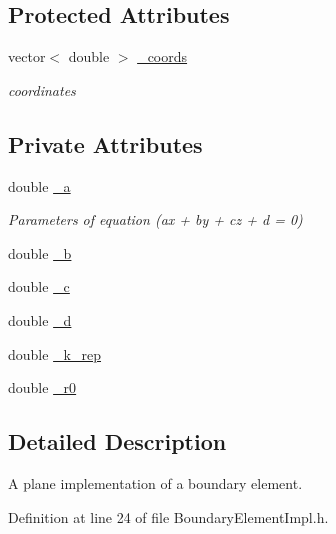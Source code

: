 \subsection*{Protected Attributes}
\begin{DoxyCompactItemize}
\item 
vector$<$ double $>$ \hyperlink{classBoundaryElement_ab51302e10e3e2def98438234ba5bf801}{\+\_\+coords}
\begin{DoxyCompactList}\small\item\em coordinates \end{DoxyCompactList}\end{DoxyCompactItemize}
\subsection*{Private Attributes}
\begin{DoxyCompactItemize}
\item 
double \hyperlink{classPlaneBoundaryElement_ad067a43fa80af86a71fa244024a3a92b}{\+\_\+a}
\begin{DoxyCompactList}\small\item\em Parameters of equation (ax + by + cz + d = 0) \end{DoxyCompactList}\item 
double \hyperlink{classPlaneBoundaryElement_a1725bf5a9d6a0d6df973bbf834f64afd}{\+\_\+b}
\item 
double \hyperlink{classPlaneBoundaryElement_ac76ace6d0b2da7e27cba5afd85ae8935}{\+\_\+c}
\item 
double \hyperlink{classPlaneBoundaryElement_a01c1e54fda120dba72c8cea1b3025ab7}{\+\_\+d}
\item 
double \hyperlink{classPlaneBoundaryElement_aaa66079ea34844957907160081ab3059}{\+\_\+k\+\_\+rep}
\item 
double \hyperlink{classPlaneBoundaryElement_a3638279689c7293ccce4d09946aa2dca}{\+\_\+r0}
\end{DoxyCompactItemize}


\subsection{Detailed Description}
A plane implementation of a boundary element. 

Definition at line 24 of file Boundary\+Element\+Impl.\+h.



